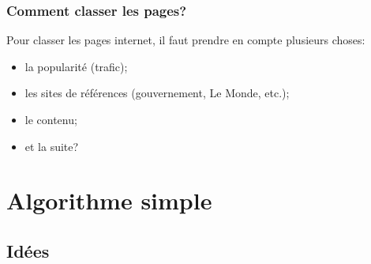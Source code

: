 \documentclass{beamer}
\begin{document}
\begin{frame}
  \frametitle{Comment classer les pages?}
  
  Pour classer les pages internet, il faut prendre en compte plusieurs
  choses:\\
  
  \begin{itemize}
    \item la popularité (trafic);
      \pause
    \item les sites de références (gouvernement, Le Monde, etc.);
      \pause
    \item le contenu;
      \pause
    \item et la suite?
  \end{itemize}

\end{frame}

\section{Algorithme simple}
\subsection{Idées}


\begin{frame}
  \tableofcontents[currentsection,subsectionstyle=hide]
\end{frame}
\end{document}
